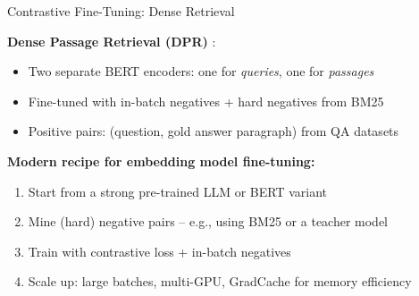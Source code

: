 \documentclass[11pt,compress,t,notes=noshow, xcolor=table]{beamer}
\begin{document}
\begin{frame}{Contrastive Fine-Tuning: Dense Retrieval}

\vfill

\textbf{Dense Passage Retrieval (DPR)} :
\begin{itemize}
  \item Two separate BERT encoders: one for \textit{queries}, one for \textit{passages}
  \item Fine-tuned with in-batch negatives + hard negatives from BM25
  \item Positive pairs: (question, gold answer paragraph) from QA datasets
\end{itemize}

\vfill

\textbf{Modern recipe for embedding model fine-tuning:}
\begin{enumerate}
  \item Start from a strong pre-trained LLM or BERT variant
  \item Mine (hard) negative pairs -- e.g., using BM25 or a teacher model
  \item Train with contrastive loss + in-batch negatives
  \item Scale up: large batches, multi-GPU, GradCache for memory efficiency
\end{enumerate}

\vfill

\end{frame}

\end{document}
